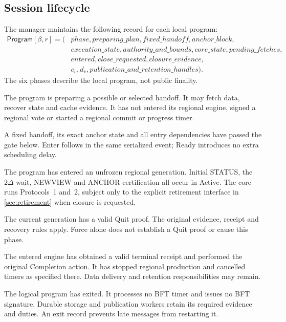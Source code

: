 \documentclass[11pt,a4paper]{article}
\newcommand{\tagg}[1]{\ensuremath{\mathsf{#1}}}
\begin{document}
\subsection{Session lifecycle}
\label{sec:session-lifecycle}
The manager maintains the following record for each local program:
\[
\begin{aligned}
\tagg{Program}[\beta,r]=(&\mathit{phase},\mathit{preparing\_plan},
 \mathit{fixed\_handoff},\mathit{anchor\_block},\\
 &\mathit{execution\_state},\mathit{authority\_and\_bounds},
 \mathit{core\_state},\mathit{pending\_fetches},\\
 &\mathit{entered},\mathit{close\_requested},\mathit{closure\_evidence},\\
 &c_v,d_v,\mathit{publication\_and\_retention\_handles}).
\end{aligned}
\]
The six phases describe the local program, not public finality.
\begin{description}[style=nextline,leftmargin=1.5em,labelindent=0pt,labelwidth=1.5em]
\item[Waiting.] The program is preparing a possible or selected
handoff. It may fetch data, recover state and cache evidence. It has
not entered its regional engine, signed a regional vote or started
a regional commit or progress timer.
\item[Ready.] A fixed handoff, its exact anchor state and all entry
dependencies have passed the gate below. Enter follows in the same
serialized event; Ready introduces no extra scheduling delay.
\item[Active.] The program has entered an unfrozen regional
generation. Initial STATUS, the $2\Delta$ wait, NEWVIEW and ANCHOR
certification all occur in Active. The core runs Protocols~1 and~2,
subject only to the explicit retirement interface in
\cref{sec:retirement} when closure is requested.
\item[Frozen.] The current generation has a valid Quit proof.
The original evidence, receipt and recovery rules apply. Force alone
does not establish a Quit proof or cause this phase.
\item[Completed.] The entered engine has obtained a valid terminal
receipt and performed the original Completion action. It has stopped
regional production and cancelled timers as specified there. Data
delivery and retention responsibilities may remain.
\item[Terminated.] The logical program has exited. It processes no
BFT timer and issues no BFT signature. Durable storage and publication
workers retain its required evidence and duties. An exit record prevents
late messages from restarting it.
\end{description}
\end{document}
